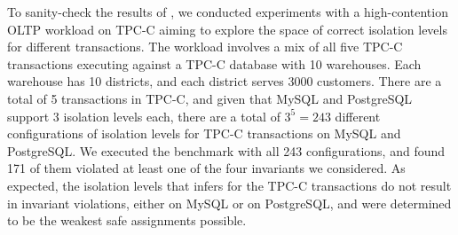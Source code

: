 
To sanity-check the results of \thetool, we conducted experiments with a
high-contention OLTP workload on TPC-C aiming to explore the space of
correct isolation levels for different transactions. The workload
involves a mix of all five TPC-C transactions executing against a
TPC-C database with 10 warehouses. Each warehouse has 10 districts,
and each district serves 3000 customers. There are a total of 5
transactions in TPC-C, and given that MySQL and PostgreSQL support 3
isolation levels each, there are a total of $3^5 = 243$ different
configurations of isolation levels for TPC-C transactions on MySQL and
PostgreSQL. We executed the benchmark with all 243 configurations, and
found 171 of them violated at least one of the four invariants we
considered.  As expected, the isolation levels that \thetool infers for the
TPC-C transactions do not result in invariant violations, either on
MySQL or on PostgreSQL, and were determined to be the weakest safe
assignments possible.

